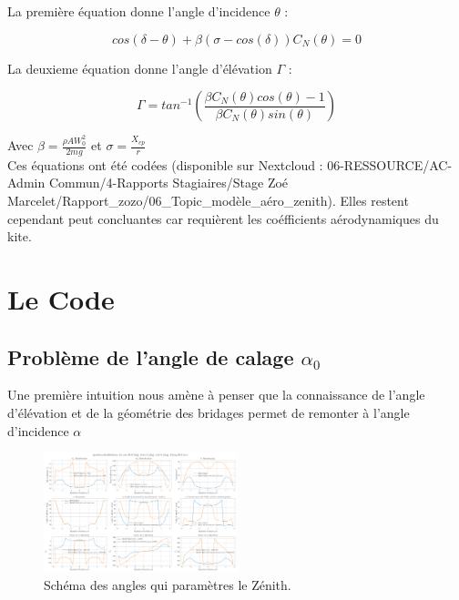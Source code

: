 \documentclass[conference]{IEEEtran}
\begin{document}
La première équation donne l’angle d’incidence $\theta$ : 
\begin{center}
    \begin{equation}
        cos(\delta - \theta) + \beta (\sigma-cos(\delta))C_N(\theta) = 0
        \label{eq:theta}
    \end{equation}
\end{center}
La deuxieme équation donne l’angle d’élévation $\Gamma$ :
\begin{center}
    \begin{equation}
        \Gamma = tan^{-1}(\frac{\beta C_N (\theta) cos(\theta)-1}{\beta C_N (\theta)sin(\theta)})
        \label{eq:gamma}
    \end{equation}
\end{center}
Avec $\beta = \frac{\rho A W_0^2}{2mg}$ et $\sigma = \frac{X_{cp}}{r}$ \\

Ces équations ont été codées (disponible sur Nextcloud : 06-RESSOURCE/AC-Admin Commun/4-Rapports Stagiaires/Stage Zoé Marcelet/Rapport\_zozo/06\_Topic\_modèle\_aéro\_zenith). 
Elles restent cependant peut concluantes car requièrent les coéfficients aérodynamiques du kite. 

\IEEEpeerreviewmaketitle
\section{Le Code }

\subsection{Problème de l'angle de calage $\alpha_0$} 


Une première intuition nous amène à penser que la connaissance de l'angle d'élévation et de la géométrie des bridages permet de remonter à l'angle d'incidence $\alpha$

\begin{figure}[H]
    \centering
    \includegraphics[width=0.5\textwidth]{Pics/circulation BEYOND.png}  
    \caption{Schéma des angles qui paramètres le Zénith.}
    \label{fig:Zénith alpha zéro}
\end{figure}
\end{document}
